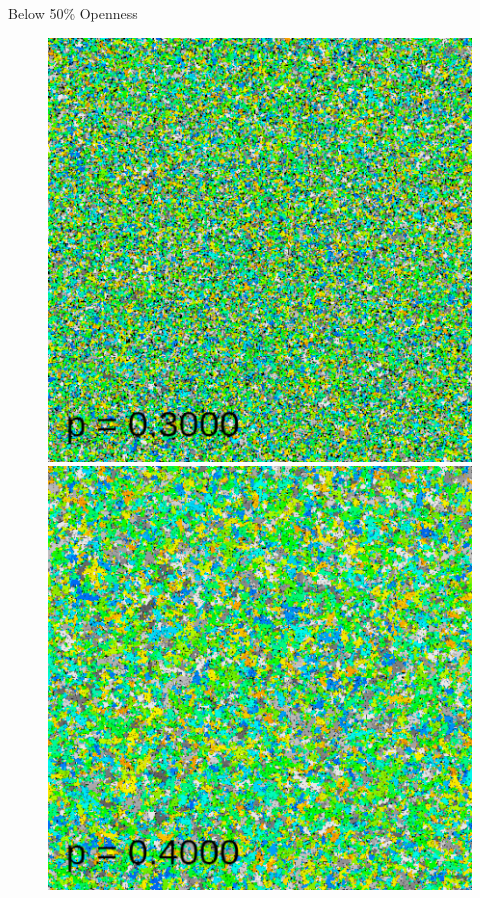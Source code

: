 \documentclass[aspectratio=169, handout]{beamer}
\begin{document}
\begin{frame}{Below 50\% Openness}
\begin{figure}
\centering
\includegraphics[scale=0.22]{percolation-gif/percolation-1-0.png}
\includegraphics[scale=0.22]{percolation-gif/percolation-1-20.png}

\end{figure}
\end{frame}
\end{document}
